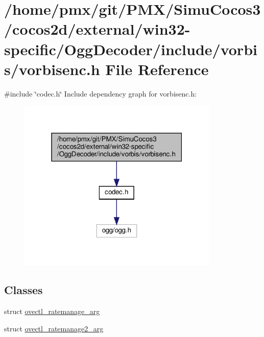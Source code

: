 \hypertarget{_2cocos2d_2external_2win32-specific_2OggDecoder_2include_2vorbis_2vorbisenc_8h}{}\section{/home/pmx/git/\+P\+M\+X/\+Simu\+Cocos3/cocos2d/external/win32-\/specific/\+Ogg\+Decoder/include/vorbis/vorbisenc.h File Reference}
\label{_2cocos2d_2external_2win32-specific_2OggDecoder_2include_2vorbis_2vorbisenc_8h}
{\ttfamily \#include \char`\"{}codec.\+h\char`\"{}}\newline
Include dependency graph for vorbisenc.\+h\+:
\nopagebreak
\begin{figure}[H]
\begin{center}
\leavevmode
\includegraphics[width=271pt]{_2cocos2d_2external_2win32-specific_2OggDecoder_2include_2vorbis_2vorbisenc_8h__incl}
\end{center}
\end{figure}
\subsection*{Classes}
\begin{DoxyCompactItemize}
\item 
struct \hyperlink{structovectl__ratemanage__arg}{ovectl\+\_\+ratemanage\+\_\+arg}
\item 
struct \hyperlink{structovectl__ratemanage2__arg}{ovectl\+\_\+ratemanage2\+\_\+arg}
\end{DoxyCompactItemize}

